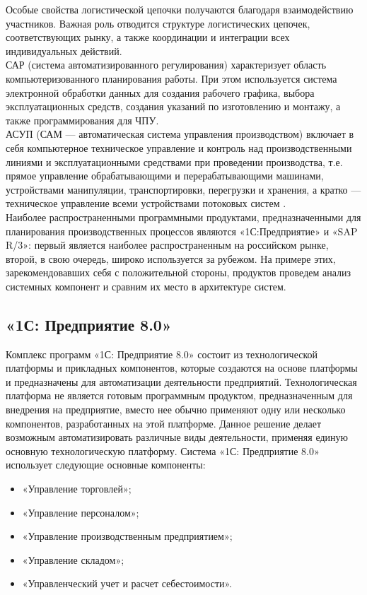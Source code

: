 Особые свойства логистической цепочки получаются благодаря взаимодействию участников. 
Важная роль отводится структуре логистических цепочек, соответствующих рынку, а также координации и интеграции всех индивидуальных действий.\\
\indent САР (система автоматизированного регулирования) характеризует область компьютеризованного планирования работы. 
При этом используется система электронной обработки данных для создания рабочего графика, выбора эксплуатационных средств, создания указаний по изготовлению и монтажу, а также программирования для ЧПУ.\\
\indent АСУП (САМ — автоматическая система управления производством) включает в себя компьютерное техническое управление и контроль над производственными линиями и эксплуатационными средствами при проведении производства, т.е. прямое управление обрабатывающими и перерабатывающими машинами, устройствами манипуляции, транспортировки, перегрузки и хранения, а кратко — техническое управление всеми устройствами потоковых систем \cite{gibBook}.\\
\indent Наиболее распространенными программными продуктами, предназначенными для планирования производственных процессов являются «1С:Предприятие» и «SAP R/3»: первый является наиболее распространенным на российском рынке, второй, в свою очередь, широко используется за рубежом. 
На примере этих, зарекомендовавших себя с положительной стороны, продуктов проведем анализ системных компонент и сравним их место в архитектуре систем.

\subsection{«1С: Предприятие 8.0»}

\indent Комплекс программ «1С: Предприятие 8.0» состоит из технологической платформы и прикладных компонентов, которые создаются на основе платформы и предназначены для автоматизации деятельности предприятий. 
Технологическая платформа не является готовым программным продуктом, предназначенным для внедрения на предприятие, вместо нее обычно применяют одну или несколько компонентов, разработанных на этой платформе. 
Данное решение делает возможным автоматизировать различные виды деятельности, применяя единую основную технологическую платформу.
\indent Система «1С: Предприятие 8.0» использует следующие основные компоненты:

\begin{itemize}
	\item «Управление торговлей»;
	\item «Управление персоналом»;
	\item «Управление производственным предприятием»;
	\item «Управление складом»;
	\item «Управленческий учет и расчет себестоимости».
\end{itemize}

